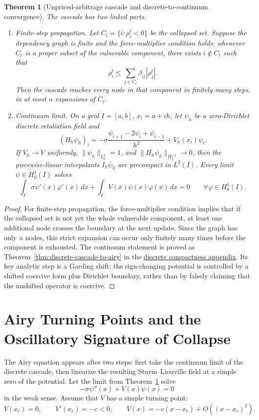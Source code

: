 \documentclass[review,authoryear]{elsarticle}
\newtheorem{theorem}{Theorem}
\theoremstyle{definition}
\theoremstyle{plain}
\begin{document}
\begin{theorem}[Unpriced-arbitrage cascade and discrete-to-continuum convergence]
\label{thm:constraint-cascade}
The cascade has two linked parts.
\begin{enumerate}
\item \emph{Finite-step propagation.}  Let $C_t=\{i:\rho_i^t<0\}$ be the collapsed set.  Suppose the dependency graph is finite and the force-multiplier condition holds: whenever $C_t$ is a proper subset of the vulnerable component, there exists $i\notin C_t$ such that
\[
\rho_i^t
\leq
\sum_{j\in C_t}\beta_{ij}|\rho_j^t|.
\]
Then the cascade reaches every node in that component in finitely many steps, in at most $n$ expansions of $C_t$.
\item \emph{Continuum limit.}  On a grid $I=[a,b]$, $x_i=a+ih$, let $\psi_h$ be a zero-Dirichlet discrete retaliation field and
\[
(H_h\psi_h)_i
=
-\sigma\frac{\psi_{i+1}-2\psi_i+\psi_{i-1}}{h^2}
+V_h(x_i)\psi_i .
\]
If $V_h\to V$ uniformly, $\|\psi_h\|_{L_h^2}=1$, and $\|H_h\psi_h\|_{H_h^{-1}}\to0$, then the piecewise-linear interpolants $I_h\psi_h$ are precompact in $L^2(I)$.  Every limit $\psi\in H_0^1(I)$ solves
\[
\int_I\sigma\psi'(x)\varphi'(x)\,dx
+
\int_I V(x)\psi(x)\varphi(x)\,dx
=0
\qquad
\forall\varphi\in H_0^1(I).
\]
\end{enumerate}
\end{theorem}
\begin{proof}
For finite-step propagation, the force-multiplier condition implies that if the collapsed set is not yet the whole vulnerable component, at least one additional node crosses the boundary at the next update.  Since the graph has only $n$ nodes, this strict expansion can occur only finitely many times before the component is exhausted.  The continuum statement is proved as Theorem~\ref{thm:discrete-cascade-to-airy} in the \hyperref[app:discrete-cascade-compactness]{discrete compactness appendix}.  Its key analytic step is a Garding shift: the sign-changing potential is controlled by a shifted coercive form plus Dirichlet boundary, rather than by falsely claiming that the unshifted operator is coercive.
\end{proof}

\section{Airy Turning Points and the Oscillatory Signature of Collapse}
\label{sec:airy}

The Airy equation appears after two steps: first take the continuum limit of the discrete cascade, then linearize the resulting Sturm--Liouville field at a simple zero of the potential.  Let the limit from Theorem~\ref{thm:constraint-cascade} solve
\[
-\sigma\psi''(x)+V(x)\psi(x)=0
\]
in the weak sense.  Assume that $V$ has a simple turning point:
\[
V(x_c)=0,
\qquad
V'(x_c)=-c<0,
\qquad
V(x)=-c(x-x_c)+O((x-x_c)^2).
\]
\end{document}
